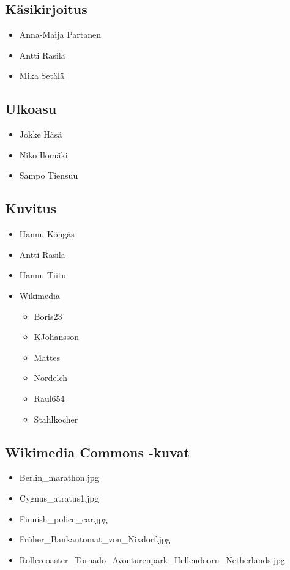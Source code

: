 \subsection*{Käsikirjoitus}
\begin{itemize}
\item Anna-Maija Partanen
\item Antti Rasila
\item Mika Setälä
\end{itemize}

\subsection*{Ulkoasu}
\begin{itemize}
\item Jokke Häsä
\item Niko Ilomäki
\item Sampo Tiensuu
\end{itemize}

\subsection*{Kuvitus}
\begin{itemize}
\item Hannu Köngäs
\item Antti Rasila
\item Hannu Tiitu
\item Wikimedia \begin{itemize}
    \item Boris23
    \item KJohansson
    \item Mattes
    \item Nordelch
    \item Raul654
    \item Stahlkocher
    \end{itemize}
\end{itemize}

\subsection*{Wikimedia Commons -kuvat}
\begin{itemize}
    \item {Berlin\_marathon.jpg}
    \item {Cygnus\_atratus1.jpg}
    \item {Finnish\_police\_car.jpg}
    \item {Früher\_Bankautomat\_von\_Nixdorf.jpg}
    \item {Rollercoaster\_Tornado\_Avonturenpark\_Hellendoorn\_Netherlands.jpg}
\end{itemize}

